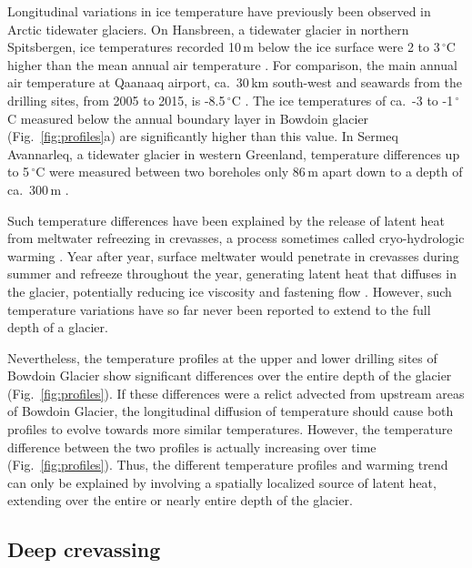 \documentclass[utf8]{article}
\begin{document}
    Longitudinal variations in ice temperature have previously been observed in
    Arctic tidewater glaciers. On Hansbreen, a tidewater glacier in northern
    Spitsbergen, ice temperatures recorded 10\,m below the ice surface were 2
    to 3\,$^\circ$C higher than the mean annual air temperature
    \citep{Jania.etal.1996}.
    For comparison, the main annual air temperature at Qaanaaq airport,
    ca.~30\,km south-west and seawards from the drilling sites, from 2005 to
    2015, is -8.5\,$^\circ$C \citep{Sugiyama.etal.2014, Tsutaki.etal.2017}. The
    ice temperatures of ca.~-3 to -1\,$^\circ$C measured below the annual
    boundary layer in Bowdoin glacier (Fig.~\ref{fig:profiles}a) are
    significantly higher than this value. In Sermeq Avannarleq, a tidewater
    glacier in
    western Greenland, temperature differences up to 5\,$^\circ$C were measured
    between two boreholes only 86\,m apart down to a depth of ca.~300\,m
    \citep{Luthi.etal.2015}.

    Such temperature differences have been explained by the release of latent
    heat from meltwater refreezing in crevasses, a process sometimes called
    cryo-hydrologic warming \citep{Phillips.etal.2010}. Year after year,
    surface meltwater would penetrate in crevasses during summer and refreeze
    throughout the year, generating latent heat that diffuses in the
    glacier, potentially reducing ice viscosity and fastening flow
    \citep{Phillips.etal.2013}. However, such temperature variations have so
    far never been reported to extend to the full depth of a glacier.

    Nevertheless, the temperature profiles at the upper and lower drilling
    sites of Bowdoin Glacier show significant differences over the entire depth
    of the glacier (Fig.~\ref{fig:profiles}). If these differences were a
    relict advected from upstream areas of Bowdoin Glacier, the longitudinal
    diffusion of temperature should cause both profiles to evolve towards more
    similar temperatures. However, the temperature difference between the two
    profiles is actually increasing over time (Fig.~\ref{fig:profiles}).
    Thus, the different temperature profiles and warming trend can only be
    explained by involving a spatially localized source of latent heat,
    extending over the entire or nearly entire depth of the glacier.


\subsection{Deep crevassing}
\end{document}
